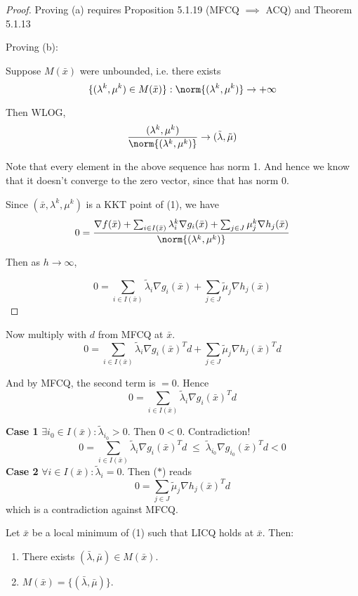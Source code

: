 \begin{proof}
	Proving (a) requires Proposition 5.1.19 (MFCQ $\implies$ ACQ) and
	Theorem 5.1.13

	Proving (b):

	Suppose $M(\bar x)$ were unbounded, i.e. there exists
	$$
		\{(\lambda^k,\mu^k)\in M(\bar x)\} : \norm{(\lambda^k,\mu^k)}\to+\infty
	$$

	Then WLOG,
	$$
		\frac{(\lambda^k,\mu^k)}{\norm{(\lambda^k,\mu^k)}}\to(\tilde\lambda,\tilde\mu)
	$$

	Note that every element in the above sequence has norm 1. And hence
	we know that it doesn't converge to the zero vector, since that has
	norm 0.

	Since $(\bar x,\lambda^k,\mu^k)$ is a KKT point of (1), we have
	$$
		0 = \frac{\nabla f(\bar x) + \sum_{i\in I(\bar x)}\lambda^k_i\nabla g_i(\bar x)
			+ \sum_{j\in J}\mu^k_j\nabla h_j(\bar x)}{\norm{(\lambda^k,\mu^k)}}
	$$

	Then as $h\to\infty$,

	\begin{equation*}
		0=\sum_{i\in I(\bar x)}\tilde\lambda_i\nabla g_i(\bar x)
		+ \sum_{j\in J}\tilde\mu_j\nabla h_j(\bar x)
	\end{equation*} %

\end{proof}

Now multiply with $d$ from MFCQ at $\bar x$.
\begin{equation*}
	0=\sum_{i\in I(\bar x)}\tilde\lambda_i\nabla g_i(\bar x)^Td
	+ \sum_{j\in J}\tilde\mu_j\nabla h_j(\bar x)^Td \tag*{($*$)}
\end{equation*}

And by MFCQ, the second term is $=0$. Hence
$$
	0=\sum_{i\in I(\bar x)}\tilde\lambda_i\nabla g_i(\bar x)^Td
$$

\textbf{Case 1} $\exists i_0 \in I(\bar x): \tilde\lambda_{i_0}>0$. Then
$0<0$. Contradiction!
$$
	0=\sum_{i\in I(\bar x)}\tilde\lambda_i\nabla g_i(\bar x)^Td
	\;\leq\;\tilde\lambda_{i_0}\nabla g_{i_0}(\bar x)^Td<0
$$
\textbf{Case 2} $\forall i\in I(\bar x):\tilde\lambda_i=0$. Then ($*$) reads
$$
	0=\sum_{j\in J}\tilde\mu_j\nabla h_j(\bar x)^Td
$$
which is a contradiction against MFCQ.

\label{c55a5f3}

Let $\bar x$ be a local minimum of (1) such that LICQ holds at $\bar
	x$. Then:
\begin{enumerate}[label=(\alph*)]
	\item There exists $(\bar\lambda,\bar\mu)\in M(\bar x)$.
	\item $M(\bar x) = \{(\bar\lambda,\bar\mu)\}$.
\end{enumerate}

